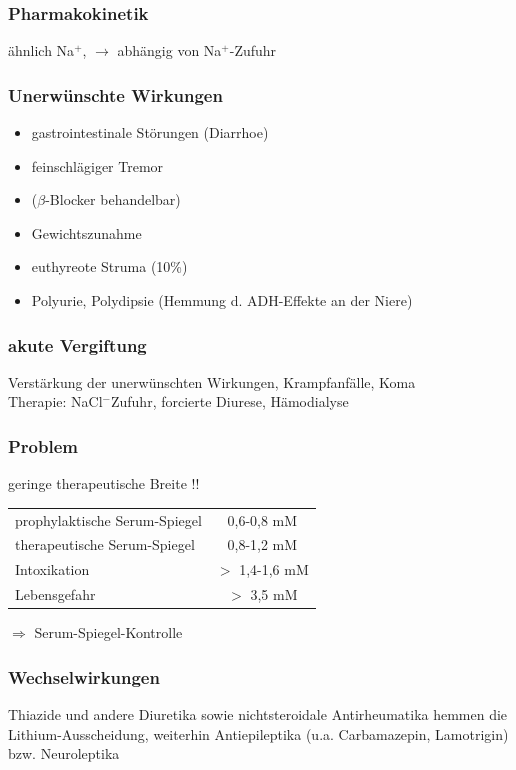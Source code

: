 \documentclass[10pt,a4paper]{report}
\begin{document}
\subsubsection{Pharmakokinetik} %
\label{ssub:pharmakokinetik}
ähnlich Na$^+$,	$\rightarrow$ abhängig von Na$^+$-Zufuhr
\subsubsection{Unerwünschte Wirkungen} %
\label{ssub:unerw_nschte_wirkungen}
\begin{itemize}
	\item gastrointestinale Störungen (Diarrhoe)
	\item feinschlägiger Tremor 
	\item ($\beta$-Blocker behandelbar)
	\item Gewichtszunahme
	\item euthyreote Struma (10\%)
	\item Polyurie, Polydipsie (Hemmung d. ADH-Effekte an der Niere)
\end{itemize}
\subsubsection{akute Vergiftung} %
\label{ssub:akute_vergiftung}
Verstärkung der unerwünschten Wirkungen, Krampfanfälle, Koma \\
Therapie: NaCl$^-$Zufuhr, forcierte Diurese, Hämodialyse
\subsubsection{Problem} %
\label{ssub:problem}
geringe therapeutische Breite !!\\
\begin{tabularx}{\textwidth}{lc}
prophylaktische Serum-Spiegel&0,6-0,8 mM\\
therapeutische Serum-Spiegel&0,8-1,2 mM\\
Intoxikation&$>$ 1,4-1,6 mM\\
Lebensgefahr&$>$ 3,5 mM\\
\end{tabularx}
$\Rightarrow$ Serum-Spiegel-Kontrolle
\subsubsection{Wechselwirkungen} %
\label{ssub:wechselwirkungen}
Thiazide und andere Diuretika sowie nichtsteroidale Antirheumatika hemmen die Lithium-Ausscheidung, weiterhin Antiepileptika (u.a. Carbamazepin, Lamotrigin) bzw. Neuroleptika 
\end{document}
